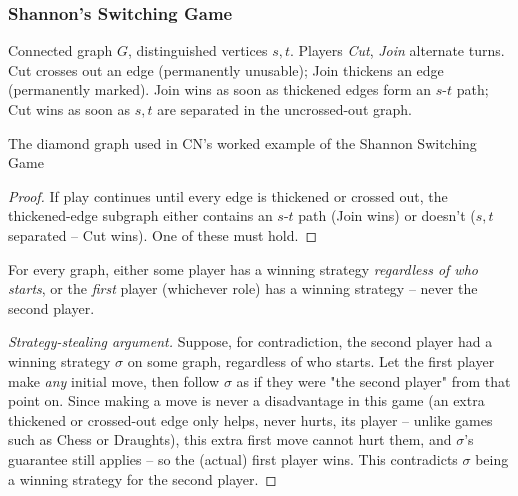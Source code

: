 \documentclass[11pt]{article}
\begin{document}
\subsubsection{Shannon's Switching Game}
\label{sec:12-6-1}

\begin{definition}
Connected graph $G$, distinguished vertices $s,t$. Players \emph{Cut}, \emph{Join} alternate turns. Cut crosses out an edge (permanently unusable); Join thickens an edge (permanently marked). Join wins as soon as thickened edges form an $s$-$t$ path; Cut wins as soon as $s,t$ are separated in the uncrossed-out graph.
\end{definition}

\begin{center}
\end{center}
\begin{center}
\small The diamond graph used in CN's worked example of the Shannon Switching Game
\end{center}

\begin{theorem}
\end{theorem}
\begin{proof}
If play continues until every edge is thickened or crossed out, the thickened-edge subgraph either contains an $s$-$t$ path (Join wins) or doesn't ($s,t$ separated -- Cut wins). One of these must hold.
\end{proof}

\bigskip
\begin{theorem}
For every graph, either some player has a winning strategy \emph{regardless of who starts}, or the \emph{first} player (whichever role) has a winning strategy -- never the second player.
\end{theorem}
\begin{proof}[Strategy-stealing argument]
Suppose, for contradiction, the second player had a winning strategy $\sigma$ on some graph, regardless of who starts. Let the first player make \emph{any} initial move, then follow $\sigma$ as if they were "the second player" from that point on. Since making a move is never a disadvantage in this game (an extra thickened or crossed-out edge only helps, never hurts, its player -- unlike games such as Chess or Draughts), this extra first move cannot hurt them, and $\sigma$'s guarantee still applies -- so the (actual) first player wins. This contradicts $\sigma$ being a winning strategy for the second player.
\end{proof}
\end{document}

